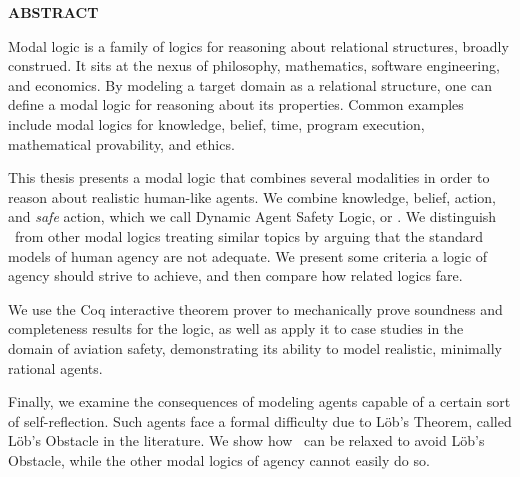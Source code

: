 \newpage
{}

\centerline{\bf \large ABSTRACT}
\vskip 10mm %
Modal logic is a family of logics for reasoning about relational structures, broadly construed. It sits at the nexus of philosophy, mathematics, software engineering, and economics. By modeling a target domain as a relational structure, one can define a modal logic for reasoning about its properties. Common examples include modal logics for knowledge, belief, time, program execution, mathematical provability, and ethics. 

This thesis presents a modal logic that combines several modalities in order to reason about realistic human-like agents. We combine knowledge, belief, action, and \emph{safe} action, which we call Dynamic Agent Safety Logic, or \DASL. We distinguish \DASL\ from other modal logics treating similar topics by arguing that the standard models of human agency are not adequate. We present some criteria a logic of agency should strive to achieve, and then compare how related logics fare.

We use the Coq interactive theorem prover to mechanically prove soundness and completeness results for the logic, as well as apply it to case studies in the domain of aviation safety, demonstrating its ability to model realistic, minimally rational agents.

Finally, we examine the consequences of modeling agents capable of a certain sort of self-reflection. Such agents face a formal difficulty due to L\"ob's Theorem, called L\"ob's Obstacle in the literature. We show how \DASL\ can be relaxed to avoid L\"ob's Obstacle, while the other modal logics of agency cannot easily do so.